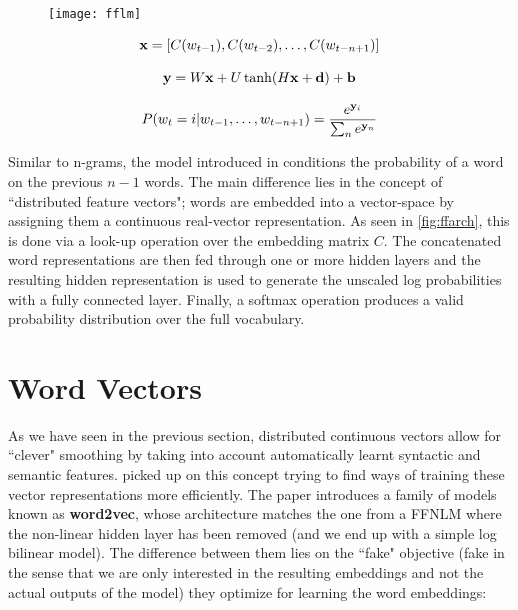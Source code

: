 \begin{figure}[H]
	\noindent\begin{minipage}{.4\linewidth}
		\centering
		\texttt{[image: fflm]}
		\label{fig:ffarch}
	\end{minipage}
	\hspace{0.25cm}
	\begin{minipage}{.7\linewidth}	
		\begin{equation} \label{eq:fwnlm}
		\openup 2ex
		\begin{gathered}
		\mathbf{x} = [C(w_{t-1}),C(w_{t-2}),\ldots,C(w_{t-n+1})] \\
		\mathbf{y} = W\mathbf{x} + U \tanh(H\mathbf{x}+\mathbf{d}) + \mathbf{b} \\
		P(w_t=i|w_{t-1},\ldots,w_{t-n+1}) = \frac{e^{\mathbf{y}_i}}{\sum_{n}e^{\mathbf{y}_n}} \\
		\end{gathered}
		\end{equation}
	\end{minipage}
\end{figure}

Similar to n-grams, the model introduced in \cite{bengio2003neural} conditions the probability of a word on the previous $n-1$ words. The main difference lies in the concept of ``distributed feature vectors"; words are embedded into a vector-space by assigning them a continuous real-vector representation. As seen in \autoref{fig:ffarch}, this is done via a look-up operation over the embedding matrix $C$. The concatenated word representations are then fed through one or more hidden layers and the resulting hidden representation is used to generate the unscaled log probabilities with a fully connected layer. Finally, a softmax operation produces a valid probability distribution over the full vocabulary.

\section{Word Vectors}
\label{sec:wv}

As we have seen in the previous section, distributed continuous vectors allow for ``clever" smoothing by taking into account automatically learnt syntactic and semantic features. \cite{mikolov2013efficient} picked up on this concept trying to find ways of training these vector representations more efficiently. The paper introduces a family of models known as \textbf{word2vec}, whose architecture matches the one from a FFNLM where the non-linear hidden layer has been removed (and we end up with a simple log bilinear model). The difference between them lies on the ``fake" objective (fake in the sense that we are only interested in the resulting embeddings and not the actual outputs of the model) they optimize for learning the word embeddings:


